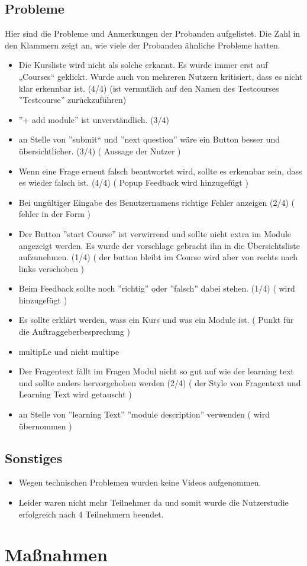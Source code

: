 \documentclass[colorback, accentcolor=tud1c, paper=a4]{tudexercise}
\begin{document}
\subsection*{Probleme}
  Hier sind die Probleme und Anmerkungen der Probanden aufgelistet. Die Zahl in den Klammern zeigt an, wie viele der Probanden ähnliche Probleme hatten.
  \begin{itemize}
    \item Die Kursliste wird nicht als solche erkannt. Es wurde immer erst auf „Courses“ geklickt. Wurde auch von mehreren Nutzern kritisiert, dass es nicht klar erkennbar ist. (4/4) (ist vermutlich auf den Namen des Testcourses ''Testcourse'' zurückzuführen)
    \item ''+ add module'' ist unverständlich. (3/4)
    \item an Stelle von ''submit“ und ''next question'' wäre ein Button besser und übersichtlicher. (3/4) ( Aussage der Nutzer )
    \item Wenn eine Frage erneut falsch beantwortet wird, sollte es erkennbar sein, dass es wieder falsch ist. (4/4) ( Popup Feedback wird hinzugefügt )
    \item Bei ungültiger Eingabe des Benutzernamens richtige Fehler anzeigen (2/4) ( fehler in der Form )
    \item Der Button ''start Course'' ist verwirrend und sollte nicht extra im Module angezeigt werden. Es wurde der vorschlage gebracht ihn in die Übersichtsliste aufzunehmen. (1/4) ( der button bleibt im Course wird aber von rechts nach links verschoben )
    \item Beim Feedback sollte noch ''richtig'' oder ''falsch'' dabei stehen. (1/4) ( wird hinzugefügt )
    \item Es sollte erklärt werden, wass ein Kurs und was ein Module ist. ( Punkt für die Auftraggeberbesprechung )
    \item multipLe und nicht multipe
    \item Der Fragentext fällt im Fragen Modul nicht so gut auf wie der learning text und sollte anders hervorgehoben werden (2/4) ( der Style von Fragentext und Learning Text wird getauscht )
    \item an Stelle von ''learning Text'' ''module description'' verwenden ( wird übernommen )
   \end{itemize}

	 \subsection*{Sonstiges}
	 	\begin{itemize}
			\item Wegen technischen Problemen wurden keine Videos aufgenommen.
			\item Leider waren nicht mehr Teilnehmer da und somit wurde die Nutzerstudie erfolgreich nach 4 Teilnehmern beendet.
		\end{itemize}
\section*{Maßnahmen}
\end{document}

